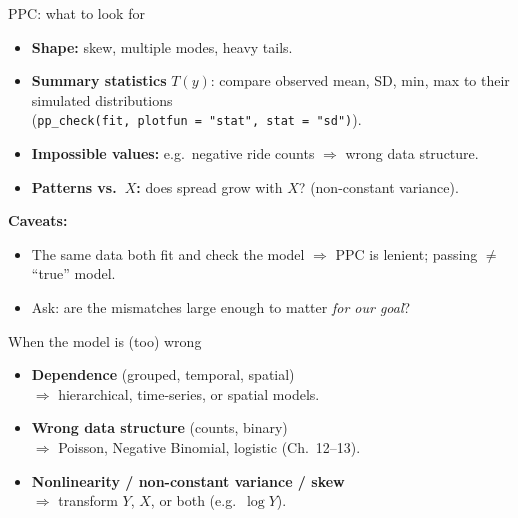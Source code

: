 \documentclass[aspectratio=43,11pt]{beamer}
\begin{document}
\begin{frame}{PPC: what to look for}
  \begin{itemize}
    \item \textbf{Shape:} skew, multiple modes, heavy tails.
    \item \textbf{Summary statistics} $T(y)$: compare observed mean, SD,
      min, max to their simulated distributions \\
      (\texttt{pp\_check(fit, plotfun = "stat", stat = "sd")}).
    \item \textbf{Impossible values:} e.g.\ negative ride counts
      $\Rightarrow$ wrong data structure.
    \item \textbf{Patterns vs.\ $X$:} does spread grow with $X$?
      (non-constant variance).
  \end{itemize}
  \vspace{0.5em}
  \textbf{Caveats:}
  \begin{itemize}
    \item The same data both fit and check the model $\Rightarrow$ PPC is
      lenient; passing $\neq$ ``true'' model.
    \item Ask: are the mismatches large enough to matter \emph{for our goal}?
  \end{itemize}
\end{frame}

\begin{frame}{When the model is (too) wrong}
  \begin{itemize}
    \item \textbf{Dependence} (grouped, temporal, spatial) \\
      $\Rightarrow$ hierarchical, time-series, or spatial models.
    \item \textbf{Wrong data structure} (counts, binary) \\
      $\Rightarrow$ Poisson, Negative Binomial, logistic (Ch.\ 12--13).
    \item \textbf{Nonlinearity / non-constant variance / skew} \\
      $\Rightarrow$ transform $Y$, $X$, or both (e.g.\ $\log Y$).
  \end{itemize}
\end{frame}
\end{document}
